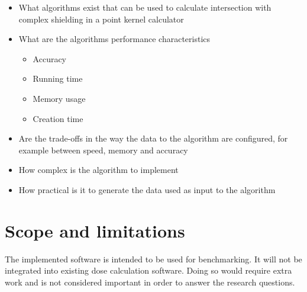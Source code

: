 \documentclass[11pt,twoside,a4paper]{report}
\begin{document}
\begin{itemize}
\item What algorithms exist that can be used to calculate intersection with complex shielding in a point kernel calculator
\item What are the algorithms performance characteristics
\begin{itemize}
\item Accuracy
\item Running time
\item Memory usage
\item Creation time
\end{itemize}
\item Are the trade-offs in the way the data to the algorithm are configured, for example between speed, memory and accuracy
\item How complex is the algorithm to implement
\item How practical is it to generate the data used as input to the algorithm
\end{itemize}



\section{Scope and limitations}
The implemented software is intended to be used for benchmarking. It will not be integrated into existing dose calculation software. Doing so would require extra work and is not considered important in order to answer the research questions.

\end{document}

